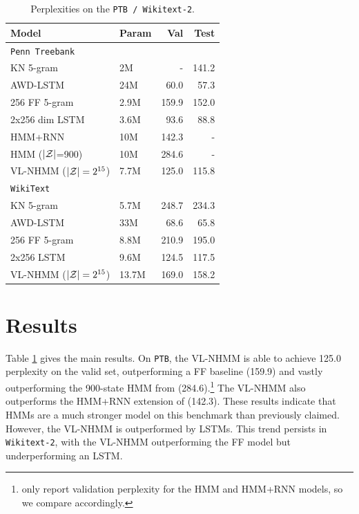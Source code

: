 \documentclass[11pt,a4paper]{article}
\begin{document}
\begin{table}[!t]
\centering
\begin{tabular}{llrr}
\toprule
Model & Param & Val  & Test \\
\midrule
\texttt{Penn Treebank}\\
\midrule
KN 5-gram   & 2M & - & 141.2\\
AWD-LSTM  & 24M & 60.0 & 57.3\\
256 FF 5-gram  & 2.9M     & 159.9      & 152.0  \\
2x256 dim LSTM  & 3.6M     & 93.6       & 88.8   \\
HMM+RNN   & 10M & 142.3 & -\\
HMM ($|\mathcal{Z}|$=900) & 10M & 284.6 & -\\
VL-NHMM ($|\mathcal{Z}|=2^{15}$)   & 7.7M     & 125.0      & 115.8  \\
\midrule
\texttt{WikiText}\\
\midrule
KN 5-gram & 5.7M       & 248.7 & 234.3\\
AWD-LSTM & 33M & 68.6 & 65.8\\
256 FF 5-gram        & 8.8M    & 210.9  & 195.0\\
2x256  LSTM     & 9.6M    & 124.5  & 117.5\\
VL-NHMM ($|\mathcal{Z}|=2^{15}$)           & 13.7M   & 169.0      & 158.2\\
\bottomrule
\end{tabular}
\caption{\label{tbl:ppl}
Perplexities on the \texttt{PTB / Wikitext-2}.
}
\end{table}


\section{Results}
Table \ref{tbl:ppl} gives the main results.
On \texttt{PTB}, the VL-NHMM is able to achieve 125.0 perplexity on the valid set,
outperforming a FF baseline (159.9)
and vastly outperforming the 900-state HMM from \citet{buys2018hmm} (284.6).\footnote{
\citet{buys2018hmm} only report validation perplexity
for the HMM and HMM+RNN models, so we compare accordingly.}
The VL-NHMM also outperforms the HMM+RNN extension of \citet{buys2018hmm} (142.3).
These results indicate that HMMs are a much stronger model
on this benchmark than previously claimed.
However, the VL-NHMM is outperformed by LSTMs.
This trend persists in \texttt{Wikitext-2},
with the VL-NHMM outperforming the FF model but underperforming an LSTM.
\end{document}
